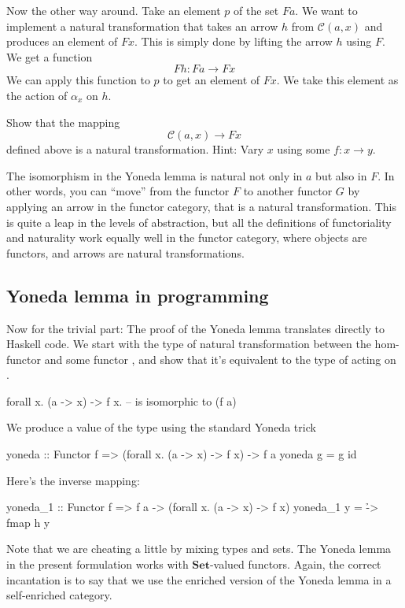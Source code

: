 \documentclass[DaoFP]{subfiles}
\begin{document}
Now the other way around. Take an element $p$ of the set $F a$. We want to implement a natural transformation that takes an arrow $h$ from $ \mathcal{C}(a, x)$ and produces an element of $F x$. This is simply done by lifting the arrow $h$ using $F$. We get a function
\[F h \colon F a \to F x \]
We can apply this function to $p$ to get an element of $F x$. We take this element as the action of $\alpha_x$ on $h$.

\begin{exercise}
Show that the mapping 
\[ \mathcal{C}(a, x) \to F x\]
defined above is a natural transformation. Hint: Vary $x$ using some $f \colon x \to y$.
\end{exercise}

The isomorphism in the Yoneda lemma is natural not only in $a$ but also in $F$. In other words, you can ``move'' from the functor $F$ to another functor $G$ by applying an arrow in the functor category, that is a natural transformation. This is quite a leap in the levels of abstraction, but all the definitions of functoriality and naturality work equally well in the functor category, where objects are functors, and arrows are natural transformations.

\subsection{Yoneda lemma in programming}

Now for the trivial part: The proof of the Yoneda lemma translates directly to Haskell code. We start with the type of natural transformation between the hom-functor  and some functor , and show that it's equivalent to the type of  acting on .
\begin{haskell}
forall x. (a -> x) -> f x.   -- is isomorphic to (f a)
\end{haskell}
We produce a value of the type  using the standard Yoneda trick
\begin{haskell}
yoneda :: Functor f => (forall x. (a -> x) -> f x) -> f a
yoneda g = g id
\end{haskell}
Here's the inverse mapping:
\begin{haskell}
yoneda_1 :: Functor f => f a -> (forall x. (a -> x) -> f x)
yoneda_1 y = \h -> fmap h y
\end{haskell}

Note that we are cheating a little by mixing types and sets. The Yoneda lemma in the present formulation works with  $\mathbf{Set}$-valued functors. Again, the correct incantation is to say that we use the enriched version of the Yoneda lemma in a self-enriched category.
\end{document}
